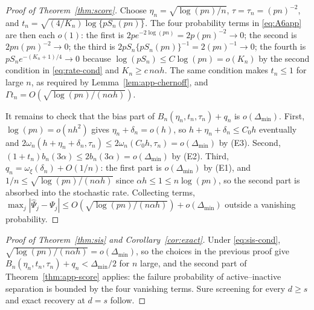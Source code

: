 \begin{proof}[Proof of Theorem~\ref{thm:score}]
Choose $\eta_n=\sqrt{\log(pn)/n}$, $\tau=\tau_n=(pn)^{-2}$, and
$t_n=\sqrt{(4/K_n)\log\{pS_n(pn)\}}$.  The four probability terms in
\eqref{eq:A6app} are then each $o(1)$: the first is
$2pe^{-2\log(pn)}=2p(pn)^{-2}\to0$; the second is $2pn(pn)^{-2}\to0$; the
third is $2pS_n\{pS_n(pn)\}^{-1}=2(pn)^{-1}\to0$; the fourth is
$pS_ne^{-(K_n+1)/4}\to0$ because $\log(pS_n)\le C\log(pn)=o(K_n)$ by the
second condition in \eqref{eq:rate-cond} and $K_n\ge c\,n\alpha h$.  The
same condition makes $t_n\le1$ for large $n$, as required by
Lemma~\ref{lem:app-chernoff}, and
$\Gamma t_n=O(\sqrt{\log(pn)/(n\alpha h)})$.

It remains to check that the bias part of $B_n(\eta_n,t_n,\tau_n)+q_n$ is
$o(\Delta_{\min})$.  First, $\log(pn)=o(nh^2)$ gives
$\eta_n+\delta_n=o(h)$, so $h+\eta_n+\delta_n\le C_0h$ eventually and
$2\omega_n(h+\eta_n+\delta_n,\tau_n)\le2\omega_n(C_0h,\tau_n)
=o(\Delta_{\min})$ by (E3).  Second,
$(1+t_n)b_n(3\alpha)\le2b_n(3\alpha)=o(\Delta_{\min})$ by (E2).  Third, $q_n=\omega_\xi(\delta_n)+O(1/n)$: the first part is
$o(\Delta_{\min})$ by (E1), and
$1/n\le\sqrt{\log(pn)/(n\alpha h)}$ since $\alpha h\le1\le n\log(pn)$, so
the second part is absorbed into the stochastic rate.  Collecting terms,
$\max_j|\widehat\Psi_j-\Psi_j|\le
O(\sqrt{\log(pn)/(n\alpha h)})+o(\Delta_{\min})$ outside a vanishing
probability.
\end{proof}

\begin{proof}[Proof of Theorem~\ref{thm:sis} and
Corollary~\ref{cor:exact}]
Under \eqref{eq:sis-cond},
$\sqrt{\log(pn)/(n\alpha h)}=o(\Delta_{\min})$, so the choices in the
previous proof give $B_n(\eta_n,t_n,\tau_n)+q_n<\Delta_{\min}/2$ for $n$
large, and the second part of Theorem~\ref{thm:app-score} applies: the
failure probability of active--inactive separation is bounded by the four
vanishing terms.  Sure screening for every $d\ge s$ and exact recovery at
$d=s$ follow.
\end{proof}
